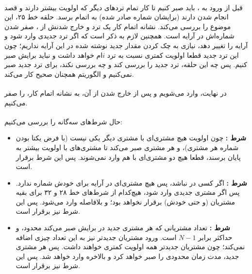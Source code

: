 \documentclass{article}
\begin{document}
	\paragraph*{}
	قبل از ورود به
	،
	باید صبر کنیم تا کار تمام ترد‌های دیگر که اولویت بیشتر دارند و قصد انجام شدن دارند (برایشان شماره صادر شده) به اتمام برسد. حلقه
	خط ۲۵، این موضوع را بررسی می‌کند. نشانه اتمام کار یک ترد و خارج شدنش از
	،
	صفر شدن شماره‌اش در آرایه
	است. همچنین لازم به ذکر است که اگر ترد جدیدی وارد شود و آرایه
	را تغییر دهد، نیازی به چک کردن مقدار جدید نوشته شده در این آرایه نداریم؛ چون این ترد جدید قطعا اولویت کمتری نسبت به ترد
	$i$ام
	خواهد داشت و نباید برایش صبر کنیم. پس چه این حلقه، ترد جدید را بررسی کند و چه بررسی نکند، برای ترد جدید صبر نمی‌کنیم و الگوریتم همچنان صحیح کار می‌کند.

	\paragraph*{}
	در نهایت، وارد
	می‌شویم و پس از خارج شدن از آن، به نشانه اتمام کار،
	را صفر می‌کنیم.

	\paragraph*{}
	حال شرط‌های سه‌گانه را بررسی می‌کنیم:
	\begin{itemize}
		\item{\textbf{
			شرط
			:
		}}
		چون اولویت هیچ مشتری‌ای با مشتری دیگر یکی نیست (با فرض یکتا بودن شماره هر مشتری)، و هر مشتری صبر می‌کند تا مشتری‌های با اولویت بیشتر به پایان برسند، قطعا هیچ دو مشتری‌ای با هم وارد
		نمی‌شوند. پس این شرط برقرار است.

		\item{\textbf{
			شرط
			:
		}}
		اگر کسی در
		نباشد، پس هیچ مشتری‌ای در آرایه
		برای خودش شماره ندارد. پس اگر مشتری جدیدی وارد شود، هیچ‌کدام از شرط‌های خط ۲۸ و ۳۲ برای بقیه مشتریان (و حتی خودش) برقرار نخواهد بود؛ و بلافاصله وارد
		می‌شود. پس این شرط نیز برقرار است.

		\item {\textbf{
			شرط
			:
		}}
		تعداد مشتریانی که هر مشتری جدید در
		برایش صبر می‌کند محدود، و حداکثر برابر
		$N - 1$
		است. ورود مشتریان جدیدتر نیز به این تعداد چیزی اضافه نمی‌کند؛ چون مشتریان جدیدتر همه اولویت کمتری خواهند داشت. پس هر مشتری جدید، مدت زمان محدودی را صبر خواهد کرد و بالاخره وارد
		خواهد شد. پس این شرط نیز برقرار است.
	\end{itemize}
\end{document}
